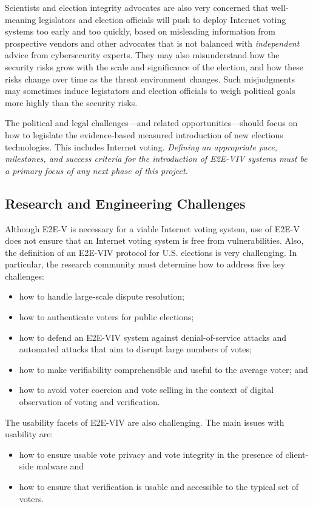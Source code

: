 Scientists and election integrity advocates are also very concerned
that well-meaning legislators and election officials will push to
deploy Internet voting systems too early and too quickly, based on
misleading information from prospective vendors and other advocates
that is not balanced with \emph{independent} advice from cybersecurity
experts.  They may also misunderstand how the security risks grow with
the scale and significance of the election, and how these risks change
over time as the threat environment changes. Such misjudgments may
sometimes induce legistators and election officials to weigh political
goals more highly than the security risks.

The political and legal challenges---and related
opportunities---should focus on how to legislate the evidence-based
measured introduction of new elections technologies. This includes
Internet voting. \emph{Defining an appropriate pace, milestones, and
  success criteria for the introduction of E2E-VIV systems must be a
  primary focus of any next phase of this project.}

\subsection{Research and Engineering Challenges}

Although E2E-V is necessary for a viable Internet voting system, use
of E2E-V does not ensure that an Internet voting system is free from
vulnerabilities. Also, the definition of an E2E-VIV protocol for
U.S. elections is very challenging. In particular, the research
community must determine how to address five key challenges:
\begin{itemize}
\item how to handle large-scale dispute resolution;
\item how to authenticate voters for public elections;
\item how to defend an E2E-VIV system against denial-of-service
  attacks and automated attacks that aim to disrupt large numbers of
  votes;
\item how to make verifiability comprehensible and useful to the
  average voter; and
\item how to avoid voter coercion and vote selling in the context of
  digital observation of voting and verification.
\end{itemize}

The usability facets of E2E-VIV are also challenging. The main issues
with usability are:
\begin{itemize}
\item how to ensure usable vote privacy and vote integrity in the
  presence of client-side malware and
\item how to ensure that verification is usable and accessible to the
  typical set of voters.
\end{itemize}

